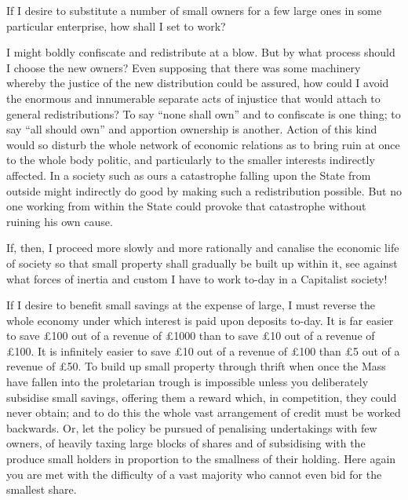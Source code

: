 \documentclass{book}
\begin{document}
If I desire to substitute a number of small owners for a few large ones in some particular enterprise, how shall I set to work?

I might boldly confiscate and redistribute at a blow. But by what process should I choose the new owners? Even supposing that there was some machinery whereby the justice of the new distribution could be assured, how could I avoid the enormous and innumerable separate acts of injustice that would attach to general redistributions? To say “none shall own” and to confiscate is one thing; to say “all should own” and apportion ownership is another. Action of this kind would so disturb the whole network of economic relations as to bring ruin at once to the whole body politic, and particularly to the smaller interests indirectly affected. In a society such as ours a catastrophe falling upon the State from outside might indirectly do good by making such a redistribution possible. But no one working from within the State could provoke that catastrophe without ruining his own cause.

If, then, I proceed more slowly and more rationally and canalise the economic life of society so that small property shall gradually be built up within it, see against what forces of inertia and custom I have to work to-day in a Capitalist society!

If I desire to benefit small savings at the expense of large, I must reverse the whole economy under which interest is paid upon deposits to-day. It is far easier to save £100 out of a revenue of £1000 than to save £10 out of a revenue of £100. It is infinitely easier to save £10 out of a revenue of £100 than £5 out of a revenue of £50. To build up small property through thrift when once the Mass have fallen into the proletarian trough is impossible unless you deliberately subsidise small savings, offering them a reward which, in competition, they could never obtain; and to do this the whole vast arrangement of credit must be worked backwards. Or, let the policy be pursued of penalising undertakings with few owners, of heavily taxing large blocks of shares and of subsidising with the produce small holders in proportion to the smallness of their holding. Here again you are met with the difficulty of a vast majority who cannot even bid for the smallest share.
\end{document}
